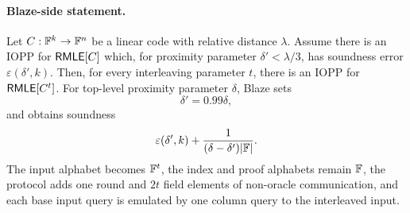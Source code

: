 \paragraph{Blaze-side statement.}
\begin{lemma}
\label{lem:blaze-interleaving-replay}
Let \(C:\mathbb{F}^k\to\mathbb{F}^n\) be a linear code with relative distance \(\lambda\).
Assume there is an IOPP for \(\mathsf{RMLE}[C]\) which, for proximity parameter
\(\delta'<\lambda/3\), has soundness error
\(\varepsilon(\delta',k)\).  Then, for every interleaving parameter \(t\),
there is an IOPP for \(\mathsf{RMLE}[C^t]\).  For top-level proximity parameter
\(\delta\), Blaze sets
\[
  \delta'=0.99\delta,
\]
and obtains soundness
\[
  \varepsilon(\delta',k)+\frac{1}{(\delta-\delta')|\mathbb{F}|}.
\]
The input alphabet becomes \(\mathbb{F}^t\), the index and proof alphabets remain
\(\mathbb{F}\), the protocol adds one round and \(2t\) field elements of non-oracle
communication, and each base input query is emulated by one column query to
the interleaved input.
\end{lemma}

